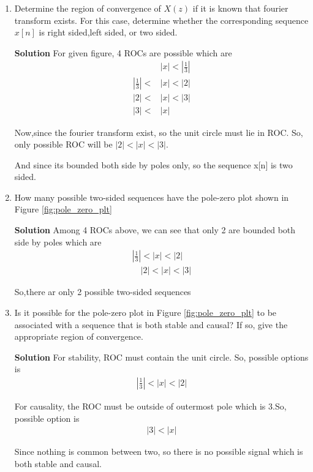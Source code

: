 \documentclass[journal,12pt,two column]{IEEEtran}
\begin{document}
\begin{enumerate}
	\item Determine the region of convergence of $X(z)$  if it is known that fourier transform exists. For this case, determine whether the corresponding sequence $x[n]$ is right sided,left sided, or two sided.
		
		\textbf{Solution} For given figure, 4 ROCs are possible which are
		\begin{align}
		&|x|<|\frac{1}{3}|\\
		|\frac{1}{3}|<&|x|<|2|\\
		|2|<&|x|<|3|\\
		 |3|<&|x|	
		\end{align}
		

		Now,since the fourier transform exist, 
	so the unit circle must lie in ROC. So,
only possible ROC will be $|2|<|x|<|3|$.

		And since its bounded both side by poles only, so the sequence x[n] is two sided.
	\item How many possible two-sided sequences have the pole-zero plot shown in Figure \ref{fig:pole_zero_plt}

		\textbf{Solution} Among 4 ROCs above, we can see that only 2 are bounded both side by poles which are 
		\begin{align}
			|\frac{1}{3}|<|x|<|2|\\  \quad|2|<|x|<|3|
		\end{align}


So,there ar only 2 possible two-sided sequences

	\item Is it possible for the pole-zero plot in Figure \ref{fig:pole_zero_plt} to be associated with a sequence that is both stable and causal? If so, give the appropriate region of convergence.
	
		\textbf{Solution} For stability, ROC must contain the unit circle. So, possible options is 
		\begin{align}
			|\frac{1}{3}|<|x|<|2|
		\end{align}

		For causality, the ROC must be outside of outermost pole which is 3.So, possible option is
		\begin{align}
			|3|<|x|
		\end{align}

		Since nothing is common between two, so there is no possible signal which is both stable and causal.
\end{enumerate}
\end{document}
